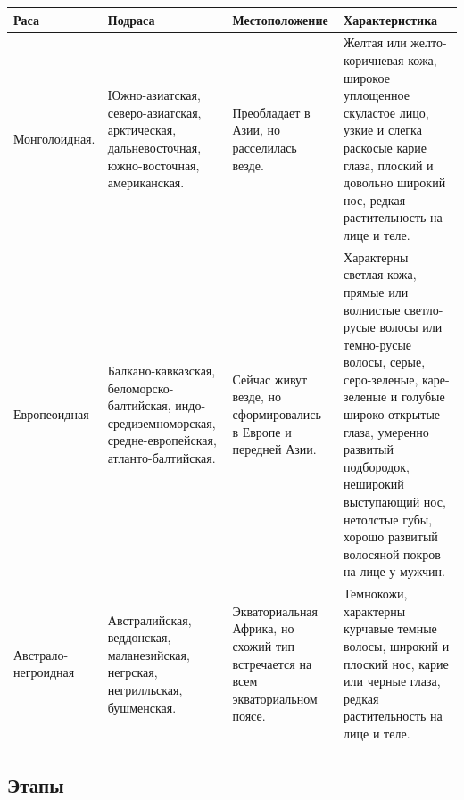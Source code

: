 \documentclass[12pt]{article}
\begin{document}
	\begin{xltabular}{\textwidth}{|X|X|X|X|}
		\hline
		\textbf{Раса} & \textbf{Подраса} & \textbf{Местоположение} & \textbf{Характеристика}\\
		\hline
		Монголоидная. & Южно-азиатская, северо-азиатская, арктическая, дальневосточная, южно-восточная, американская. & Преобладает в Азии, но расселилась везде. & Желтая или желто-коричневая кожа, широкое уплощенное скуластое лицо, узкие и слегка раскосые карие глаза, плоский и довольно широкий нос, редкая растительность на лице и теле.\\
		\hline
		Европеоидная & Балкано-кавказская, беломорско-балтийская, индо-средиземноморская, средне-европейская, атланто-балтийская. & Сейчас живут везде, но сформировались в Европе и передней Азии. & Характерны светлая кожа, прямые или волнистые светло-русые волосы или темно-русые волосы, серые, серо-зеленые, каре-зеленые и голубые широко открытые глаза, умеренно развитый подбородок, неширокий выступающий нос, нетолстые губы, хорошо развитый волосяной покров на лице у мужчин.\\
		\hline
		Австрало-негроидная & Австралийская, веддонская, маланезийская, негрская, негрилльская, бушменская. & Экваториальная Африка, но схожий тип встречается на всем экваториальном поясе. & Темнокожи, характерны курчавые темные волосы, широкий и плоский нос, карие или черные глаза, редкая растительность на лице и теле.\\
		\hline
	\end{xltabular}
	
	\subsection{Этапы}
	
\end{document}
